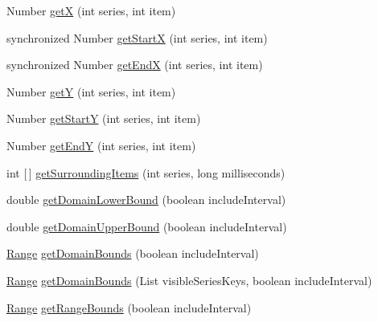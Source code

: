 \begin{DoxyCompactItemize}
\item 
Number \mbox{\hyperlink{classorg_1_1jfree_1_1data_1_1time_1_1_time_series_collection_afaf4cb9df5f63edbe8b1eff071b9b8d0}{getX}} (int series, int item)
\item 
synchronized Number \mbox{\hyperlink{classorg_1_1jfree_1_1data_1_1time_1_1_time_series_collection_a20209bf09ed5d7d58e01508a6a53a5fa}{get\+StartX}} (int series, int item)
\item 
synchronized Number \mbox{\hyperlink{classorg_1_1jfree_1_1data_1_1time_1_1_time_series_collection_a0c6fbda683133ad5e4a0443e93a1cefa}{get\+EndX}} (int series, int item)
\item 
Number \mbox{\hyperlink{classorg_1_1jfree_1_1data_1_1time_1_1_time_series_collection_a43ff1a03fa8e1f41ad1e1f611b9d28fb}{getY}} (int series, int item)
\item 
Number \mbox{\hyperlink{classorg_1_1jfree_1_1data_1_1time_1_1_time_series_collection_a39159edbe3d2f1ee4e990eba2294ca1e}{get\+StartY}} (int series, int item)
\item 
Number \mbox{\hyperlink{classorg_1_1jfree_1_1data_1_1time_1_1_time_series_collection_af7975c0f5e474a5daac76d2313a23f19}{get\+EndY}} (int series, int item)
\item 
int \mbox{[}$\,$\mbox{]} \mbox{\hyperlink{classorg_1_1jfree_1_1data_1_1time_1_1_time_series_collection_a9762237c520a0a01830db8665c543da3}{get\+Surrounding\+Items}} (int series, long milliseconds)
\item 
double \mbox{\hyperlink{classorg_1_1jfree_1_1data_1_1time_1_1_time_series_collection_a83943a7efe069eddacb00364bbcef030}{get\+Domain\+Lower\+Bound}} (boolean include\+Interval)
\item 
double \mbox{\hyperlink{classorg_1_1jfree_1_1data_1_1time_1_1_time_series_collection_ac3a9f4f6c020c7797a7788a412d34463}{get\+Domain\+Upper\+Bound}} (boolean include\+Interval)
\item 
\mbox{\hyperlink{classorg_1_1jfree_1_1data_1_1_range}{Range}} \mbox{\hyperlink{classorg_1_1jfree_1_1data_1_1time_1_1_time_series_collection_a3d78b109c0a1f7a9795f8c5108613084}{get\+Domain\+Bounds}} (boolean include\+Interval)
\item 
\mbox{\hyperlink{classorg_1_1jfree_1_1data_1_1_range}{Range}} \mbox{\hyperlink{classorg_1_1jfree_1_1data_1_1time_1_1_time_series_collection_ac13a6953fa601e775d100b576c73f052}{get\+Domain\+Bounds}} (List visible\+Series\+Keys, boolean include\+Interval)
\item 
\mbox{\hyperlink{classorg_1_1jfree_1_1data_1_1_range}{Range}} \mbox{\hyperlink{classorg_1_1jfree_1_1data_1_1time_1_1_time_series_collection_a7fbccedea041dde90def01addb148752}{get\+Range\+Bounds}} (boolean include\+Interval)

\end{DoxyCompactItemize}
